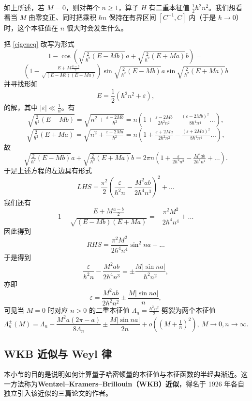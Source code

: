 如上所述，若 $M=0$，则对每个 $n\ge 1$，算子 $H$ 有二重本征值
$\frac{1}{2}\hbar^2 n^2$。我们想看看当 $M$ 由零变正、同时把乘积 $\hbar n$ 保持在有界区间 $[C^{-1},C]$ 内（于是 $\hbar\to 0$）时，这个本征值在 $n$ 很大时会发生什么。

把 \eqref{eigeneq} 改写为形式
$$
1-\cos \left(\sqrt{\tfrac{2}{\hbar^2}(E-Mb)}a+\sqrt{\tfrac{2}{\hbar^2}(E+Ma) }b\right)=
$$
$$
\left(1-\tfrac{E+M\frac{a-b}{2}}{\sqrt{(E-Mb)(E+Ma)}}\right)\sin \sqrt{\tfrac{2}{\hbar^2}(E-Mb)} a \sin \sqrt{\tfrac{2}{\hbar^2}(E+Ma)} b
$$
并寻找形如
$$
E=\frac{1}{2}(\hbar^2 n^2+\varepsilon),
$$
的解，其中 $|\varepsilon|\ll \frac{1}{n}$。有
$$
\sqrt{\tfrac{2}{\hbar^2}(E-Mb)}=\sqrt{n^2+\tfrac{\varepsilon-2Mb}{\hbar^2}}=n\left(1+\tfrac{\varepsilon-2Mb}{2\hbar^2 n^2}-\tfrac{(\varepsilon-2Mb)^2}{8\hbar^4 n^4}...\right),
$$
$$
\sqrt{\tfrac{2}{\hbar^2}(E+Ma)}=\sqrt{n^2+\tfrac{\varepsilon+2Ma}{\hbar^2}}=n\left(1+\tfrac{\varepsilon+2Ma}{2\hbar^2 n^2}-\tfrac{(\varepsilon+2Ma)^2}{8\hbar^4 n^4}...\right),
$$
故
$$
\sqrt{\tfrac{2}{\hbar^2}(E-Mb)}a+\sqrt{\tfrac{2}{\hbar^2}(E+Ma) }b=2\pi n\left(1+\tfrac{\varepsilon}{2\hbar^2 n^2}-\tfrac{M^2ab}{2\hbar^4n^4}+...\right).
$$
于是上述方程的左边具有形式
$$
LHS=\frac{\pi^2}{2}\left(\frac{\varepsilon}{\hbar^2 n}-\frac{M^2ab}{2\hbar^4n^3}\right)^2+...
$$
我们还有
$$
1-\frac{E+M\frac{a-b}{2}}{\sqrt{(E-Mb)(E+Ma)}}=-\frac{\pi^2M^2}{2\hbar^4n^4}+...
$$
因此得到
$$
RHS=\frac{\pi^2M^2}{2\hbar^4n^4}\sin^2 na+...
$$
于是得到
$$
\frac{\varepsilon}{\hbar^2 n}-\frac{M^2ab}{2\hbar^4n^3}=\pm \frac{M|\sin na|}{\hbar^2n^2}, 
$$
亦即
$$
\varepsilon=\frac{M^2ab}{2\hbar^2n^2}\pm \frac{M|\sin na|}{n}, 
$$
可见当 $M=0$ 时对应 $n>0$ 的二重本征值 $\Lambda_n=\frac{\hbar^2 n^2}{2}$ 劈裂为两个本征值
\begin{equation}\label{bifur}
\Lambda_n^\pm(M)=\Lambda_n+\frac{M^2a(2\pi -a)}{8\Lambda_n}\pm \frac{M|\sin na|}{2n}+o((M+\tfrac{1}{n})^2),\ M\to 0,n\to \infty.
\end{equation}

\subsection{WKB 近似与 Weyl 律}

本小节的目的是说明如何计算量子哈密顿量的本征值与本征函数的半经典渐近。这一方法称为\textbf{Wentzel–Kramers–Brillouin（WKB）近似}，得名于 1926 年各自独立引入该近似的三篇论文的作者。

